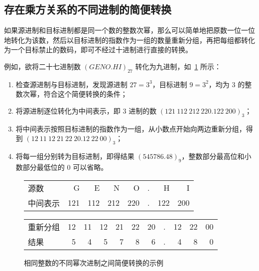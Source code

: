     \subsection{存在乘方关系的不同进制的简便转换}\label{subsec:NumberSystemBasics/positional-notation-conversion/powered-base}
        如果源进制和目标进制都是同一个数的整数次幂，那么可以简单地把原数一位一位地转化为该数，然后以目标进制的指数作为一组的数量重新分组，再把每组都转化为一个目标禁止的数码，即可不经过十进制进行直接的转换。

        例如，欲将二十七进制数 $(GENO.HI)_{27}$ 转化为九进制，如~\ref{fig:NumberSystemBasics/positional-notation-conversion/powered-base/with-intermediate} 所示：

        \begin{enumerate}
            \item 检查源进制与目标进制，发现源进制 $27 = 3 ^ 3$，目标进制 $9 = 3 ^ 2$，均为 $3$ 的整数次幂，符合这个简便转换的条件；
            \item 将源进制逐位转化为中间表示，即 $3$ 进制的数 $(121\ 112\ 212\ 220.122\ 200)_3$；
            \item 将中间表示按照目标进制的指数作为一组，从小数点开始向两边重新分组，得到 $(12\ 11\ 12\ 21\ 22\ 20.12\ 22\ 00)_3$；
            \item 将每一组分别转为目标进制，即得结果 $(545786.48)_9$，整数部分最高位和小数部分最低位的 $0$ 可以省略。
        \end{enumerate}

        \begin{figure}
            \centering
            \begin{tabular}{lrrrrrrr}
                源数     &   G &   E &   N &   O & . &   H &   I \\
                中间表示 & 121 & 112 & 212 & 220 & . & 122 & 200 \\ \hline
            \end{tabular}
            \begin{tabular}{lrrrrrrrrrr}
                重新分组 & 12 & 11 & 12 & 21 & 22 & 20 & . & 12 & 22 & 00 \\
                结果     &  5 &  4 &  5 &  7 &  8 &  6 & . &  4  &  8 &  0
            \end{tabular}
            \caption{相同整数的不同幂次进制之间简便转换的示例}
            \label{fig:NumberSystemBasics/positional-notation-conversion/powered-base/with-intermediate}
        \end{figure}
